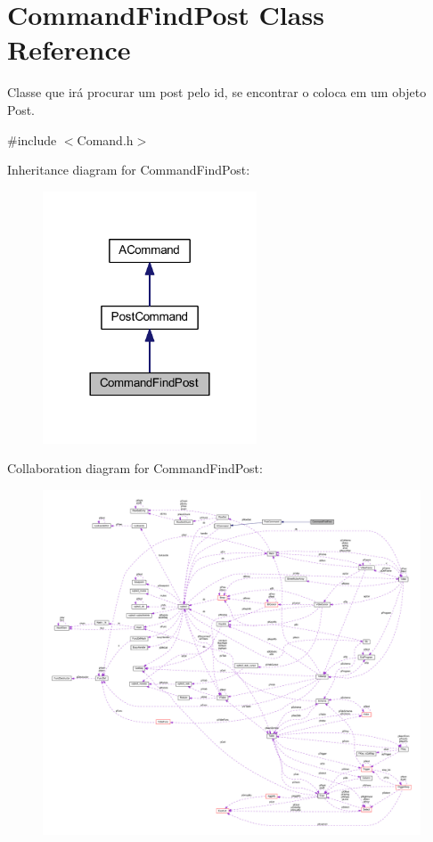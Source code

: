 \hypertarget{class_command_find_post}{\section{Command\-Find\-Post Class Reference}
\label{class_command_find_post}
}


Classe que irá procurar um post pelo id, se encontrar o coloca em um objeto Post.  




{\ttfamily \#include $<$Comand.\-h$>$}



Inheritance diagram for Command\-Find\-Post\-:\nopagebreak
\begin{figure}[H]
\begin{center}
\leavevmode
\includegraphics[width=180pt]{class_command_find_post__inherit__graph}
\end{center}
\end{figure}


Collaboration diagram for Command\-Find\-Post\-:\nopagebreak
\begin{figure}[H]
\begin{center}
\leavevmode
\includegraphics[width=350pt]{class_command_find_post__coll__graph}
\end{center}
\end{figure}
